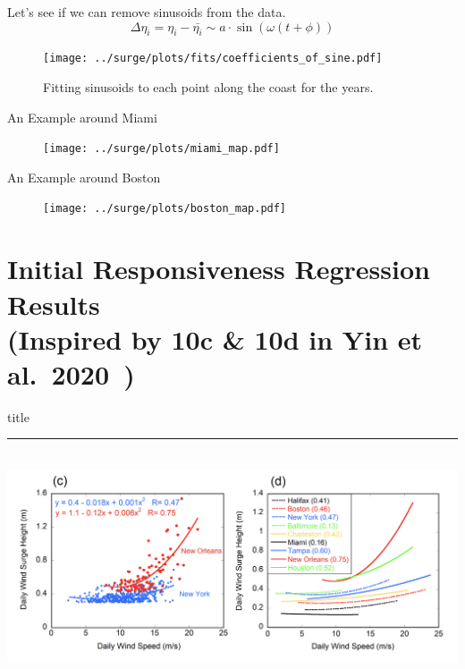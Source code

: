 \documentclass[usenames, dvipsnames]{beamer}
\begin{document}
\begin{frame}{Let's see if we can remove sinusoids from the data. }
\begin{equation}
\Delta\eta_i = \eta_i - \bar{\eta_i} \sim a\cdot \sin{(\omega(t + \phi))}
\end{equation}
\vspace{-20pt}
\begin{figure}[htb!]
    \centering
    \hspace{-10pt}
    \texttt{[image: ../surge/plots/fits/coefficients\_of\_sine.pdf]}
    \vspace{-7pt}
   \caption{Fitting sinusoids to each point along the coast for the years.}
    \label{fig:}
\end{figure}
\end{frame}



\begin{frame}{An Example around Miami}
\vspace{-30pt}
\begin{figure}[htb!]
    \centering
    \texttt{[image: ../surge/plots/miami\_map.pdf]}
\end{figure}
\end{frame}


\begin{frame}{An Example around Boston}
\vspace{-30pt}
\begin{figure}[htb!]
    \centering
    \texttt{[image: ../surge/plots/boston\_map.pdf]}
\end{figure}
\end{frame}


\section{Initial Responsiveness Regression Results\\
(Inspired by 10c \& 10d in Yin et al.~2020~\cite{ZannaPreprint})}
    \begin{frame}[plain]
        \vfill
      \centering
      \begin{beamercolorbox}[sep=8pt,center,shadow=true,rounded=true]{title}
        \insertsectionhead\par%
        \color{oxfordblue}\noindent\rule{10cm}{1pt} \\
        \includegraphics[width=1\linewidth]{images/example-images/yin-responsiveness.png}
      \end{beamercolorbox}
      \vfill
  \end{frame}
\end{document}
